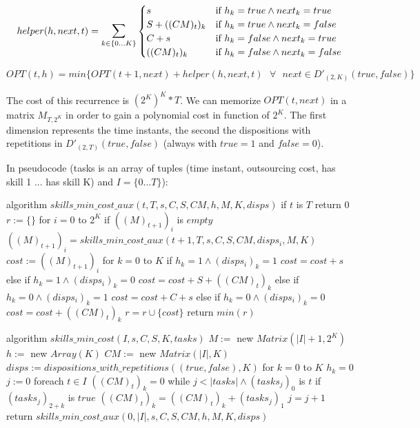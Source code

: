 \documentclass[paper=a4, fontsize=11pt]{scrartcl} %
\numberwithin{equation}{section} %
\numberwithin{figure}{section} %
\numberwithin{table}{section} %
\begin{document}
\[
    helper(h, next, t) = \mathlarger{\sum}_{k \in \{0 ... K\}}
    \begin{cases}
        s & \text{if } h_k = true \land next_k = true \\
        S + ((CM)_t)_k & \text{if } h_k = true \land next_k = false \\
        C + s & \text{if } h_k = false \land next_k = true \\
        ((CM)_t)_k & \text{if } h_k = false \land next_k = false
    \end{cases}
\]

\[
    OPT(t, h) = min\Big\{ OPT(t+1, next) + helper(h, next, t)  \text{ }\forall\text{ } next \in D'_{(2,K)}({true, false})\Big\}
\]

The cost of this recurrence is $(2^K)^K*T$. 
We can memorize $OPT(t, next)$ in a matrix $M_{T,2^K}$ in order to gain a polynomial cost in function of $2^K$. The first dimension represents the time instants, the second the dispositions with repetitions in $D'_{(2,T)}({true, false})$ (always with $true=1$ and $false=0$).

In pseudocode (tasks is an array of tuples (time instant, outsourcing cost, has skill 1 ... has skill K) and $I = \{0 ... T\}$):

\begin{pseudo}
algorithm $skills\_min\_cost\_aux(t, T, s, C, S, CM, h, M, K, disps)$
    if $t$ is $T$
        return $0$
    $r := \{\}$
    for $i = 0$ to $2^K$
        if $((M)_{t+1})_i$ is $empty$
            $((M)_{t+1})_i = skills\_min\_cost\_aux(t+1, T, s, C, S, CM, disps_i, M, K)$
        $cost := ((M)_{t+1})_i$
        for $k = 0$ to $K$
            if $h_k = 1 \land (disps_i)_k = 1$
                $cost = cost + s$
            else if $h_k = 1 \land (disps_i)_k = 0$
                $cost = cost + S + ((CM)_t)_k$
            else if $h_k = 0 \land (disps_i)_k = 1$
                $cost = cost + C + s$
            else if $h_k = 0 \land (disps_i)_k = 0$
                $cost = cost + ((CM)_t)_k$
        $r = r \cup \{cost\}$
    return $min(r)$
\end{pseudo}

\begin{pseudo}
algorithm $skills\_min\_cost(I, s, C, S, K, tasks)$
    $M :=$ new $Matrix(|I|+1, 2^K)$
    $h := $ new $Array(K)$
    $CM :=$ new $Matrix(|I|, K)$
    $disps := dispositions\_with\_repetitions((true, false), K)$
    for $k = 0$ to $K$
        $h_k = 0$
        $j := 0$
        foreach $t \in I$
            $((CM)_t)_k = 0$
            while $j < |tasks| \land (tasks_j)_0$ is $t$
                if $(tasks_j)_{2+k}$ is $true$
                    $((CM)_t)_k = ((CM)_t)_k + (tasks_j)_1$
                $j = j +1$
    return $skills\_min\_cost\_aux(0, |I|, s, C, S, CM, h, M, K, disps)$
\end{pseudo}
\end{document}
